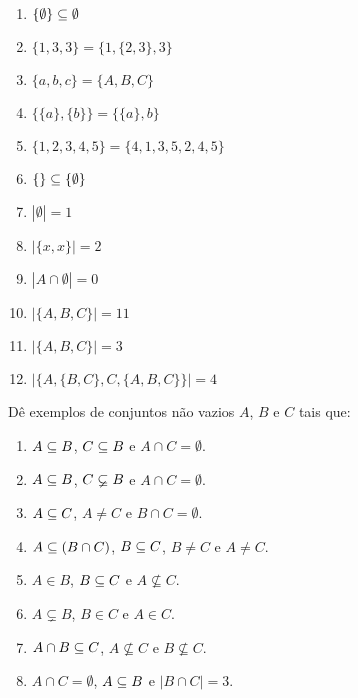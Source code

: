 \documentclass[12pt]{exam}
\begin{document}
\begin{multicols}{2}
\begin{enumerate}[label={\arabic*})]
            \item $\{\emptyset\} \subseteq \emptyset$

            \item $\{1, 3, 3\} = \{1, \{2, 3\}, 3\}$

            \item $\{a, b, c\} = \{A, B, C\}$

            \item $\{\{a\}, \{b\}\} = \{\{a\}, b\}$

            \item $\{1, 2, 3, 4, 5\} = \{4, 1, 3, 5, 2, 4, 5\}$

            \item $\{\} \subseteq \{\emptyset\}$

            \item $|\emptyset| = 1$

            \item $|\{x,x\}| = 2$

            \item $|A \cap \emptyset | = 0$

            \item $|\{A, B, C\}| = 11$

            \item $|\{A, B, C\}| = 3$

            \item $|\{A, \{B, C\}, C, \{A, B, C\}\}| = 4$

        \end{enumerate}
    \end{multicols}

    \questao{} Dê exemplos de conjuntos não vazios $A$, $B$ e $C$ tais que:
    \begin{enumerate}[label={\alph*})]
        \item $A \subseteq B$, $C \subseteq B$ e $A \cap C = \emptyset$.

        \item $A \subseteq B$, $C \varsubsetneq B$ e $A \cap C = \emptyset$.

        \item $A \subseteq C$, $A \ne C$ e $B \cap C = \emptyset$.

        \item $A \subseteq (B \cap C)$, $B \subseteq C$, $B \ne C$ e $A \ne C$.

        \item $A \in B$, $B \subseteq C$ e $A \nsubseteq C$.

        \item $A \subsetneq B$, $B \in C$ e $A \in C$.

        \item $A \cap B \subseteq C$, $A \nsubseteq C$ e $B \nsubseteq C$.

        \item $A \cap C = \emptyset$, $A \subseteq B$ e $|B \cap C| = 3$.
    \end{enumerate}
\end{document}
